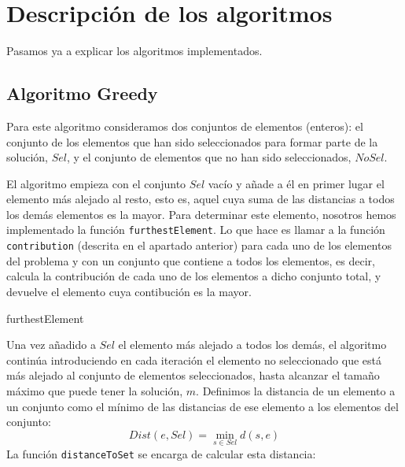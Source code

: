 \documentclass[10pt,a4paper]{article}
\begin{document}
	
	\section{Descripción de los algoritmos}
	
	Pasamos ya a explicar los algoritmos implementados. 
		
	\subsection{Algoritmo Greedy}
	
	Para este algoritmo consideramos dos conjuntos de elementos (enteros): el conjunto de los elementos que han sido seleccionados para formar parte de la solución, $Sel$, y el conjunto de elementos que no han sido seleccionados, $NoSel$. 
	
	El algoritmo empieza con el conjunto $Sel$ vacío y añade a él en primer lugar el elemento más alejado al resto, esto es, aquel cuya suma de las distancias a todos los demás elementos es la mayor. Para determinar este elemento, nosotros hemos implementado la función \lstinline|furthestElement|. Lo que hace es llamar a la función \lstinline|contribution| (descrita en el apartado anterior) para cada uno de los elementos del problema y con un conjunto que contiene a todos los elementos, es decir, calcula la contribución de cada uno de los elementos a dicho conjunto total, y devuelve el elemento cuya contibución es la mayor. 

	\begin{algorithm}[H]
		\caption{\sc furthestElement}
	\end{algorithm}
	
	Una vez añadido a $Sel$ el elemento más alejado a todos los demás, el algoritmo continúa introduciendo en cada iteración el elemento no seleccionado que está más alejado al conjunto de elementos seleccionados, hasta alcanzar el tamaño máximo que puede tener la solución, $m$. Definimos la distancia de un elemento a un conjunto como el mínimo de las distancias de ese elemento a los elementos del conjunto:
	$$ Dist(e,Sel)=\min_{s \in Sel} d(s,e) $$
	La función \lstinline|distanceToSet| se encarga de calcular esta distancia:
	
\end{document}
